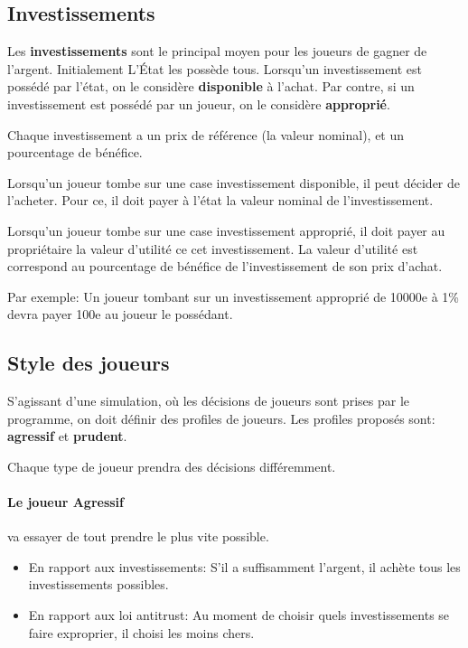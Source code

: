 \documentclass[12pt]{article}
\begin{document}
    \subsection{Investissements}
	Les \textbf{investissements} sont le principal moyen pour les joueurs de gagner de l'argent. 
	Initialement L'\'Etat les possède tous.
	Lorsqu'un investissement est possédé par l'état, on le considère \textbf{disponible} à l'achat. 
	Par contre, si un investissement est possédé par un joueur, on le considère \textbf{approprié}.
	
	Chaque investissement a un prix de référence (la valeur nominal),  et un pourcentage de bénéfice.
	
	Lorsqu'un joueur tombe sur une case investissement disponible, il peut décider de l'acheter. 
	Pour ce, il doit payer à l'état la valeur nominal de l'investissement. 
	
	Lorsqu'un joueur tombe sur une case investissement approprié, il doit payer au propriétaire la valeur d'utilité ce cet investissement. 
	La valeur d'utilité est correspond au pourcentage de bénéfice de l'investissement de son prix d'achat. 
	
	Par exemple: Un joueur tombant sur un investissement approprié de 10000e à 1\% devra payer 100e au joueur le possédant.
	 
	
    \subsection{Style des joueurs}
    S'agissant d'une simulation, où les décisions de joueurs sont prises par le programme, on doit définir des profiles de joueurs.
    Les profiles proposés sont: \textbf{agressif} et \textbf{prudent}.
    
   Chaque type de joueur prendra des décisions différemment.
   
   \paragraph {Le joueur Agressif}  va essayer de tout prendre le plus vite possible. 
   \begin{itemize}
   	\item En rapport aux investissements: S'il a suffisamment l'argent, il achète tous les investissements possibles.
	\item En rapport aux loi antitrust: Au moment de choisir quels investissements se faire exproprier, il choisi les moins chers.
   \end{itemize}
   
\end{document}
